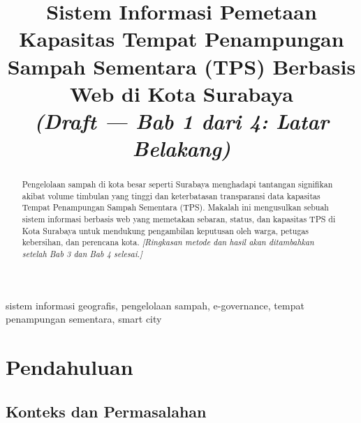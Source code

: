 \documentclass[conference]{IEEEtran}
\begin{document}
\title{Sistem Informasi Pemetaan Kapasitas Tempat Penampungan Sampah Sementara (TPS) Berbasis Web di Kota Surabaya\\
    \large \textit{(Draft --- Bab 1 dari 4: Latar Belakang)}}

\author{
}

\maketitle

\begin{abstract}
    Pengelolaan sampah di kota besar seperti Surabaya menghadapi tantangan
    signifikan akibat volume timbulan yang tinggi dan keterbatasan
    transparansi data kapasitas Tempat Penampungan Sampah Sementara (TPS).
    Makalah ini mengusulkan sebuah sistem informasi berbasis web yang
    memetakan sebaran, status, dan kapasitas TPS di Kota Surabaya untuk
    mendukung pengambilan keputusan oleh warga, petugas kebersihan, dan
    perencana kota. \textit{[Ringkasan metode dan hasil akan ditambahkan
            setelah Bab 3 dan Bab 4 selesai.]}
\end{abstract}

\begin{IEEEkeywords}
    sistem informasi geografis, pengelolaan sampah, e-governance, tempat penampungan sementara, smart city
\end{IEEEkeywords}

\section{Pendahuluan}

\subsection{Konteks dan Permasalahan}
\end{document}
